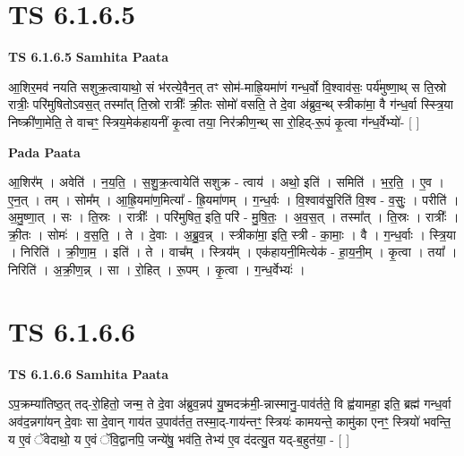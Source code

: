\documentclass[17pt]{extarticle}
\begin{document}

\section{ TS 6.1.6.5 }

\textbf{TS 6.1.6.5 } \newline
\textbf{Samhita Paata} \newline

आ॒शिर॒मव॑ नयति सशुक्र॒त्वायाथो॒ सं भ॑रत्ये॒वैन॒त् तꣳ सोम॑-माह्रि॒यमा॑णं गन्ध॒र्वो वि॒श्वाव॑सः॒ पर्य॑मुष्णा॒थ् स ति॒स्रो रात्रीः॒ परि॑मुषितोऽवस॒त् तस्मा᳚त् ति॒स्रो रात्रीः᳚ क्री॒तः सोमो॑ वसति॒ ते दे॒वा अ॑ब्रुव॒न्थ् स्त्रीका॑मा॒ वै ग॑न्ध॒र्वा स्स्त्रि॒या निष्क्री॑णा॒मेति॒ ते वाचꣳ॒॒ स्त्रिय॒मेक॑हायनीं कृ॒त्वा तया॒ निर॑क्रीण॒न्थ् सा रो॒हिद्-रू॒पं कृ॒त्वा ग॑न्ध॒र्वेभ्यो॑- [  ] \newline

\textbf{Pada Paata} \newline

आ॒शिर᳚म् । अवेति॑ । न॒य॒ति॒ । स॒शु॒क्र॒त्वायेति॑ सशुक्र - त्वाय॑ । अथो॒ इति॑ । समिति॑ । भ॒र॒ति॒ । ए॒व । ए॒न॒त् । तम् । सोम᳚म् । आ॒ह्रि॒यमा॑ण॒मित्या᳚ - ह्रि॒यमा॑णम् । ग॒न्ध॒र्वः । वि॒श्वाव॑सु॒रिति॑ वि॒श्व - व॒सुः॒ । परीति॑ । अ॒मु॒ष्णा॒त् । सः । ति॒स्रः । रात्रीः᳚ । परि॑मुषित॒ इति॒ परि॑ - मु॒षि॒तः॒ । अ॒व॒स॒त् । तस्मा᳚त् । ति॒स्रः । रात्रीः᳚ । क्री॒तः । सोमः॑ । व॒स॒ति॒ । ते । दे॒वाः । अ॒ब्रु॒व॒न्न् । स्त्रीका॑मा॒ इति॒ स्त्री - का॒माः॒ । वै । ग॒न्ध॒र्वाः । स्त्रि॒या । निरिति॑ । क्री॒णा॒म॒ । इति॑ । ते । वाच᳚म् । स्त्रिय᳚म् । एक॑हायनी॒मित्येक॑ - हा॒य॒नी॒म् । कृ॒त्वा । तया᳚ । निरिति॑ । अ॒क्री॒ण॒न्न् । सा । रो॒हित् । रू॒पम् । कृ॒त्वा । ग॒न्ध॒र्वेभ्यः॑ ।  \newline





\section{ TS 6.1.6.6 }

\textbf{TS 6.1.6.6 } \newline
\textbf{Samhita Paata} \newline

ऽप॒क्रम्या॑तिष्ठ॒त् तद्-रो॒हितो॒ जन्म॒ ते दे॒वा अ॑ब्रुव॒न्नप॑ यु॒ष्मदक्र॑मी॒-न्नास्मानु॒-पाव॑र्तते॒ वि ह्व॑यामहा॒ इति॒ ब्रह्म॑ गन्ध॒र्वा अव॑द॒न्नगा॑यन् दे॒वाः सा दे॒वान् गाय॑त उ॒पाव॑र्तत॒ तस्मा॒द्-गाय॑न्तꣳ॒॒ स्त्रियः॑ कामयन्ते॒ कामु॑का एनꣳ॒॒ स्त्रियो॑ भवन्ति॒ य ए॒वं ॅवेदाथो॒ य ए॒वं ॅवि॒द्वानपि॒ जन्ये॑षु॒ भव॑ति॒ तेभ्य॑ ए॒व द॑दत्यु॒त यद्-ब॒हुत॑या॒ - [  ] \newline
\end{document}
